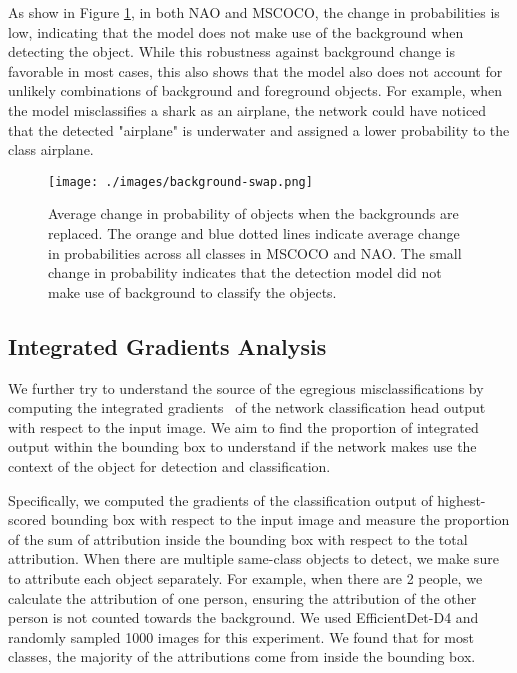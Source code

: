 \documentclass[final]{cvpr}
\begin{document}
As show in Figure \ref{fig:background_swap_changes}, in both NAO and MSCOCO, the change in probabilities is low, indicating that the model does not make use of the background when detecting the object. While this robustness against background change is favorable in most cases, this also shows that the model also does not account for unlikely combinations of background and foreground objects. For example, when the model misclassifies a shark as an airplane, the network could have noticed that the detected "airplane" is underwater and assigned a lower probability to the class airplane.



\begin{figure}[t]
\begin{center}
   \texttt{[image: ./images/background-swap.png]}
\end{center}
   \caption{Average change in probability of objects when the backgrounds are replaced. The orange and blue dotted lines indicate average change in probabilities across all classes in MSCOCO and NAO. The small change in probability indicates that the detection model did not make use of background to classify the objects.}
\label{fig:long}
\label{fig:onecol}
\label{fig:background_swap_changes}
\end{figure}

\subsection{Integrated Gradients Analysis}

We further try to understand the source of the egregious misclassifications by computing the integrated gradients~\cite{Sundararajan2017-jl} of the network classification head output with respect to the input image. We aim to find the proportion of integrated output within the bounding box to understand if the network makes use the context of the object for detection and classification.







Specifically, we computed the gradients of the classification output of highest-scored bounding box with respect to the input image and measure the proportion of the sum of attribution inside the bounding box with respect to the total attribution. 
When there are multiple same-class objects to detect, we make sure to attribute each object separately. 
For example, when there are 2 people, we calculate the attribution of one person, ensuring the attribution of the other person is not counted towards the background.
We used EfficientDet-D4 and randomly sampled 1000 images for this experiment. We found that for most classes, the majority of the attributions come from inside the bounding box.
\end{document}
